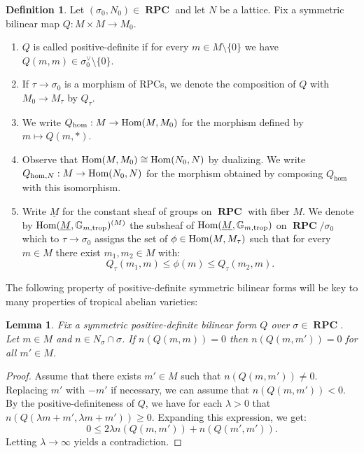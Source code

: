 \documentclass[11pt]{amsart}
\newtheorem{lemma}[theorem]{Lemma}
\theoremstyle{definition}
\newtheorem{definition}[theorem]{Definition}
\theoremstyle{remark}
\def\hom{\mathrm{hom}}
\def\trop{\mathrm{trop}}
\DeclareMathOperator{\RPC}{\mathbf{RPC}}
\DeclareMathOperator{\Hom}{\textup{Hom}}
\begin{document}
\begin{definition}
	Let $(\sigma_0,N_0)\in \RPC$ and let $N$ be a lattice. Fix a symmetric bilinear map $Q:M\times M\to M_0$.

	\begin{enumerate}
		\item $Q$ is called positive-definite if for every $m\in M\setminus \{0\}$ we have $Q(m,m)\in \sigma_0^{\vee}\setminus \{0\}$.
		\item If $\tau\to \sigma_0$ is a morphism of RPCs, we denote the composition of $Q$ with $M_0\to M_{\tau}$ by $Q_{\tau}$.
		\item We write $Q_{\hom}:M\to \Hom(M,M_0)$ for the morphism defined by $m\mapsto Q(m,\ast)$.
		\item Observe that $\Hom(M,M_0)\cong \Hom(N_0,N)$ by dualizing. We write $Q_{\hom,N}:M\to \Hom(N_0,N)$ for the morphism obtained
			by composing $Q_{\hom}$ with this isomorphism.
		\item Write $\underline{M}$ for the constant sheaf of groups on $\RPC$ with fiber $M$. We denote by
			$\Hom(\underline{M},\mathbb{G}_{m,\trop})^{(M)}$ the subsheaf of $\Hom(\underline{M},\mathbb{G}_{m,\trop})$ on $\RPC/\sigma_0$
			which to $\tau\to \sigma_0$ assigns the set of $\phi\in \Hom(M,M_{\tau})$ such that for every $m\in M$ there exist
			$m_1,m_2\in M$ with:
			$$Q_{\tau}(m_1,m)\le \phi(m)\le Q_{\tau}(m_2,m).$$
	\end{enumerate}
\end{definition}

The following property of positive-definite symmetric bilinear forms will be key to many properties of tropical abelian varieties:

\begin{lemma}
	\label{lem:pos_definite_vanishing}
	Fix a symmetric positive-definite bilinear form $Q$ over $\sigma\in \RPC$.
	Let $m\in M$ and $n\in N_{\sigma}\cap \sigma$. If $n(Q(m,m))=0$ then $n(Q(m,m'))=0$ for all $m'\in M$.
\end{lemma}

\begin{proof}
	Assume that there exists $m'\in M$ such that $n(Q(m,m'))\neq 0$. Replacing $m'$ with $-m'$ if necessary, we can assume
	that $n(Q(m,m'))<0$. By the positive-definiteness of $Q$, we have for each $\lambda>0$ that $n(Q(\lambda m+m',\lambda m+m'))\ge 0$.
	Expanding this expression, we get:
	$$0\le 2\lambda n(Q(m,m'))+n(Q(m',m')).$$
	Letting $\lambda\to \infty $ yields a contradiction.
\end{proof}
\end{document}

